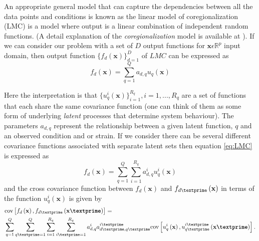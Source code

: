 An appropriate general model that can capture the dependencies between all the data points and conditions is known as the linear model of coregionalization (LMC) is a model where output is a linear combination of independent random functions. (A detail explanation of the \emph{coregionalization} model is available at \cite{Alvarez:2011, Alvarez:2012}). If we can consider our problem with a set of $D$ output functions for $\textbf{x}\epsilon\mathbb{R}^p$ input domain, then output function $\{ f_d\left(\textbf{x}\right)\}^D_{d=1}$ of $LMC$ can be expressed as
\begin{equation} \label{eq:LMC}
f_d\left(\textbf{x}\right)=\sum\limits_{q=1}^Q a_{d,q}u_q\left(\textbf{x}\right)
\end{equation}

Here the interpretation is that $\{u_q^i\left(\textbf{x}\right)\}^{R_q}_{i=1}, i= 1,..., R_q$ are a set of functions that each share the same covariance function (one can think of them as some form of underlying \emph{latent} processes that determine system behaviour). The parameters $a_{d, q}$ represent the relationship between a given latent function, $q$ and an observed condition and or strain. If we consider there can be several different covariance functions associated with separate latent sets then equation \ref{eq:LMC} is expressed as
\begin{equation} \label{eq:LMClatent}
f_d\left(\textbf{x}\right)=\sum\limits_{q=1}^Q \sum\limits_{i=1}^{R_q} a^i_{d,q}u^i_q\left(\textbf{x}\right)
\end{equation}
and the cross covariance function between $f_d\left(\textbf{x}\right)$ and 
$f_{d\textprime}\left(\textbf{x}\right)$ in terms of the function $u^i_q\left(\textbf{x}\right)$
is given by
\begin{equation} \label{eq:LMCcov}
\begin{split}
&\text{cov} \left[ f_d\left(\textbf{x}\right), f_{d\textprime}\left(\textbf{x\textprime}\right)\right]=\\
&\sum\limits_{q=1}^Q \sum\limits_{q\textprime=1}^Q \sum\limits_{i=1}^{R_q} \sum\limits_{i\textprime=1}^{R_q}
a^i_{d,q}a^{i\textprime}_{d\textprime,q\textprime} 
\text{cov} \left[ u^i_q\left(\textbf{x}\right),u^{i\textprime}_{q\textprime}\left(\textbf{x\textprime}\right) \right].
\end{split}
\end{equation}

